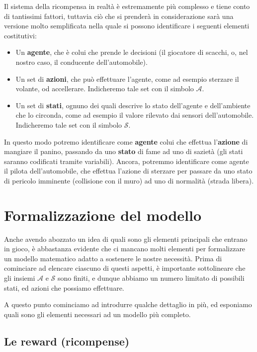 \documentclass[a4paper,11pt,twoside]{report} %
\begin{document}
Il sistema della ricompensa in realtà è estremamente più complesso e tiene conto di tantissimi fattori, tuttavia ciò che si prenderà in considerazione sarà una versione molto semplificata nella quale si possono identificare i seguenti elementi costitutivi:

\begin{itemize}
\item Un \textbf{agente}, che è colui che prende le decisioni (il giocatore di scacchi, o, nel nostro caso, il conducente dell'automobile).
\item Un set di \textbf{azioni}, che può effettuare l'agente, come ad esempio sterzare il volante, od accellerare. Indicheremo tale set con il simbolo $\mathcal{A}$.
\item Un set di \textbf{stati}, ognuno dei quali descrive lo stato dell'agente e dell'ambiente che lo circonda, come ad esempio il valore rilevato dai sensori dell'automobile. Indicheremo tale set con il simbolo $\mathcal{S}$.
\end{itemize}

In questo modo potremo identificare come \textbf{agente} colui che effettua l'\textbf{azione} di mangiare il panino, passando da uno \textbf{stato} di fame ad uno di sazietà (gli stati saranno codificati tramite variabili). Ancora, potremmo identificare come agente il pilota dell'automobile, che effettua l'azione di sterzare per passare da uno stato di pericolo imminente (collisione con il muro) ad uno di normalità (strada libera).

\section{Formalizzazione del modello}

Anche avendo abozzato un idea di quali sono gli elementi principali che entrano in gioco, è abbastanza evidente che ci mancano molti elementi per formalizzare un modello matematico adatto a sostenere le nostre necessità. Prima di cominciare ad elencare ciascuno di questi aspetti, è importante sottolineare che gli insiemi $\mathcal{A}$ e $\mathcal{S}$ sono finiti, e dunque abbiamo un numero limitato di possibili stati, ed azioni che possiamo effettuare. 

A questo punto cominciamo ad introdurre qualche dettaglio in più, ed esponiamo quali sono gli elementi necessari ad un modello più completo.

\subsection{Le reward (ricompense)}
\end{document}
